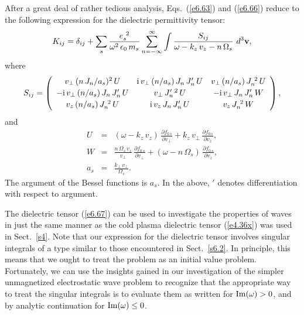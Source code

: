 After a great deal of rather tedious analysis, Eqs.~(\ref{e6.63}) and (\ref{e6.66}) reduce to
the following expression for the dielectric permittivity tensor:
\begin{equation}\label{e6.67}
K_{ij} = \delta_{ij} + \sum_s \frac{e_s^{~2}}{\omega^2\,\epsilon_0\,m_s}
\sum_{n=-\infty}^\infty \int \frac{S_{ij}}{\omega - k_z \,v_z - n\,{\Omega}_s}
\,\,d^3{\bf v},
\end{equation}
where
\begin{equation}
S_{ij} = \left(
\begin{array}{ccc}
v_\perp\,(n\,J_n/a_s)^2\,U & {\rm i}\,v_\perp\,(n/a_s)\,J_n\,J_n' \,U&
v_\perp\,(n/a_s)\,J_n^{~2}\,U\\[0.5ex]
-{\rm i}\,v_\perp\,(n/a_s)\,J_n\,J_n'\,U& v_\perp\,J_n'^{~2}\,U & -{\rm i}\,v_\perp\,J_n\,J_n'\,W\\[0.5ex]
v_z\,(n/a_s)\,J_n^{~2}\,U & {\rm i}\,v_z\,J_n\,J_n'\,U & v_z\,J_n^{~2}\,W\end{array}
 \right),
\end{equation}
and
\begin{eqnarray}
U&=& (\omega-k_z\,v_z)\,\frac{\partial f_{0\,s}}{\partial v_\perp}
+ k_z\,v_\perp\,\frac{\partial f_{0\,s}}{\partial v_z},\\[0.5ex]
W&=& \frac{n\,{\Omega}_s\,v_z}{v_\perp} \,\frac{\partial f_{0\,s}}
{\partial v_\perp} + (\omega -n\,{\Omega}_s)\,\frac{\partial f_{0\,s}}
{\partial v_z},\\[0.5ex]
a_s &=& \frac{k_\perp\,v_\perp}{{\Omega}_s}.
\end{eqnarray}
The argument of the Bessel functions is $a_s$. In the above, $'$ denotes
differentiation with respect to argument.

The dielectric tensor (\ref{e6.67}) can be used to investigate the properties of waves
in just the same manner as the cold plasma dielectric tensor (\ref{e4.36x}) was used in 
Sect.~\ref{s4}. Note that our expression for the dielectric tensor involves
singular integrals of a type similar to those encountered in Sect.~\ref{s6.2}. In
principle, this means that we ought to treat the problem as an initial
value problem. Fortunately,  we can use the insights gained in our investigation of
the simpler unmagnetized electrostatic wave problem to recognize that the
appropriate way to treat the singular integrals is to evaluate them as
written for ${\rm Im}(\omega)>0$, and by analytic continuation
for ${\rm Im}(\omega)\leq 0$. 

